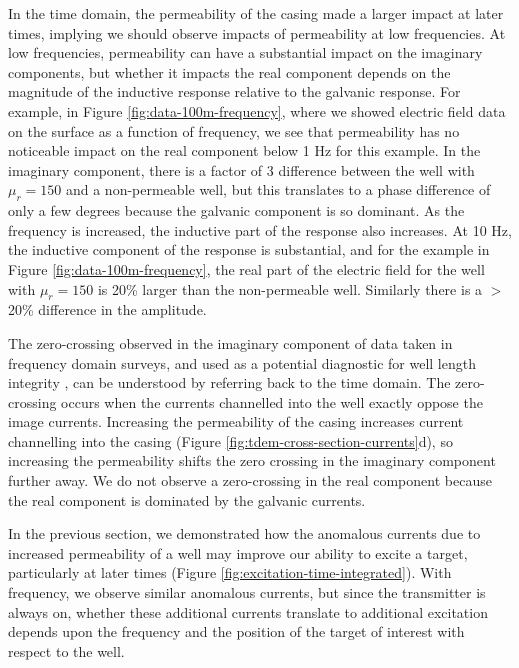 \documentclass[onecolumn, extra, mreferee]{gji}
\begin{document}
In the time domain, the permeability of the casing made a larger impact at later times, implying we should observe impacts of permeability at low frequencies. At low frequencies, permeability can have a substantial impact on the imaginary components, but whether it impacts the real component depends on the magnitude of the inductive response relative to the galvanic response. For example, in Figure \ref{fig:data-100m-frequency}, where we showed electric field data on the surface as a function of frequency, we see that permeability has no noticeable impact on the real component below 1 Hz for this example. In the imaginary component, there is a factor of 3 difference between the well with $\mu_r = 150$ and a non-permeable well, but this translates to a phase difference of only a few degrees because the galvanic component is so dominant. As the frequency is increased, the inductive part of the response also increases. At 10 Hz, the inductive component of the response is substantial, and for the example in Figure \ref{fig:data-100m-frequency}, the real part of the electric field for the well with $\mu_r = 150$ is 20\% larger than the non-permeable well. Similarly there is a $>$20\% difference in the amplitude.

The zero-crossing observed in the imaginary component of data taken in frequency domain surveys, and used as a potential diagnostic for well length integrity \citep{wilt_casing_2020}, can be understood by referring back to the time domain. The zero-crossing occurs when the currents channelled into the well exactly oppose the image currents. Increasing the permeability of the casing increases current channelling into the casing (Figure \ref{fig:tdem-cross-section-currents}d), so increasing the permeability shifts the zero crossing in the imaginary component further away. We do not observe a zero-crossing in the real component because the real component is dominated by the galvanic currents.

In the previous section, we demonstrated how the anomalous currents due to increased permeability of a well may improve our ability to excite a target, particularly at later times (Figure \ref{fig:excitation-time-integrated}). With frequency, we observe similar anomalous currents, but since the transmitter is always on, whether these additional currents translate to additional excitation depends upon the frequency and the position of the target of interest with respect to the well.
\end{document}
